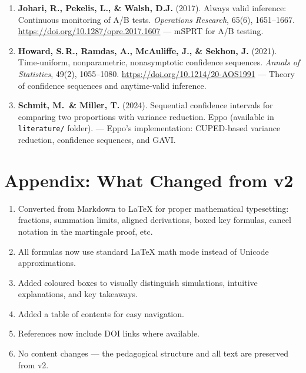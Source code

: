 \documentclass[12pt, a4paper]{article}
\begin{document}
\begin{enumerate}
  \item \textbf{Johari, R., Pekelis, L., \& Walsh, D.J.} (2017).
        Always valid inference: Continuous monitoring of A/B tests.
        \textit{Operations Research}, 65(6), 1651--1667.
        \url{https://doi.org/10.1287/opre.2017.1607}
        --- mSPRT for A/B testing.

  \item \textbf{Howard, S.\,R., Ramdas, A., McAuliffe, J., \& Sekhon, J.}
        (2021).
        Time-uniform, nonparametric, nonasymptotic confidence sequences.
        \textit{Annals of Statistics}, 49(2), 1055--1080.
        \url{https://doi.org/10.1214/20-AOS1991}
        --- Theory of confidence sequences and anytime-valid inference.

  \item \textbf{Schmit, M.\ \& Miller, T.} (2024).
        Sequential confidence intervals for comparing two proportions with
        variance reduction.
        Eppo (available in \texttt{literature/} folder).
        --- Eppo's implementation: CUPED-based variance reduction, confidence
        sequences, and GAVI.
\end{enumerate}


\newpage
\section*{Appendix: What Changed from v2}

\begin{enumerate}[nosep]
  \item Converted from Markdown to \LaTeX{} for proper mathematical
        typesetting: fractions, summation limits, aligned derivations,
        boxed key formulas, cancel notation in the martingale proof, etc.
  \item All formulas now use standard \LaTeX{} math mode instead of Unicode
        approximations.
  \item Added coloured boxes to visually distinguish simulations, intuitive
        explanations, and key takeaways.
  \item Added a table of contents for easy navigation.
  \item References now include DOI links where available.
  \item No content changes --- the pedagogical structure and all text are
        preserved from v2.
\end{enumerate}
\end{document}
